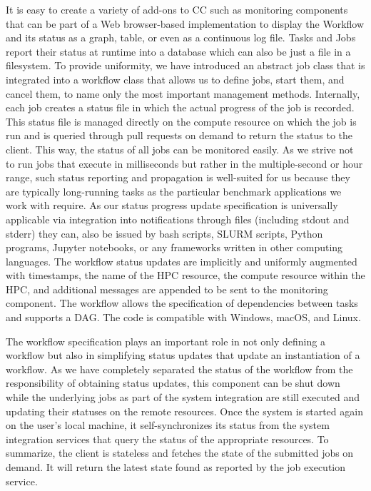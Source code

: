 \documentclass[sigconf]{acmart}
\begin{document}
It is easy to create a variety of add-ons to CC such as monitoring components that can be part of a Web browser-based implementation to display the Workflow and its status as a graph, table, or even as a continuous log file.  Tasks and Jobs report their status at runtime into a database which can also be just a file in a filesystem.  To provide uniformity,  we have introduced an abstract job class that is integrated into a workflow class that allows us to define jobs, start them, and cancel them, to name only the most important management methods. Internally, each job creates a status file in which the actual progress of the job is recorded.  This status file is managed directly on the compute resource on which the job is run and is queried through pull requests on demand to return the status to the client. This way, the status of all jobs can be monitored easily. As we strive not to run jobs that execute in milliseconds but rather in the multiple-second or hour range, such status reporting and propagation is well-suited for us because they are typically long-running tasks as the particular benchmark applications we work with require.  As our status progress update specification is universally applicable via integration into notifications through files (including stdout and stderr) they can, also be issued by bash scripts, SLURM scripts, Python programs, Jupyter notebooks, or any frameworks written in other computing languages. The workflow status updates are implicitly and uniformly augmented with timestamps, the name of the HPC resource, the compute resource within the HPC, and additional messages are appended to be sent to the monitoring component.  The workflow allows the specification of dependencies between tasks and supports a DAG. The code is compatible with Windows, macOS, and Linux.


The workflow specification plays an important role in not only defining a workflow but also in simplifying status updates that update an instantiation of a workflow. As we have completely separated the status of the workflow from the responsibility of obtaining status updates, this component can be shut down while the underlying jobs as part of the system integration are still executed and updating their statuses on the remote resources. Once the system is started again on the user's local machine, it self-synchronizes its status from the system integration services that query the status of the appropriate resources. To summarize, the client is stateless and fetches the state of the submitted jobs on demand. It will return the latest state found as reported by the job execution service.
\end{document}
